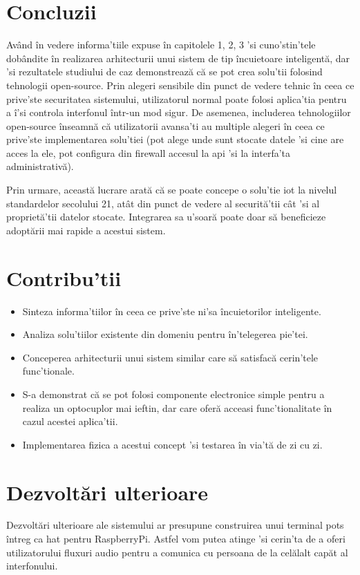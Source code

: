 \section{Concluzii}

Având în vedere informa'tiile expuse în capitolele 1, 2, 3 'si cuno'stin'tele dobândite în realizarea arhitecturii unui sistem de tip încuietoare inteligentă, dar 'si rezultatele studiului de caz demonstrează că se pot crea solu'tii folosind tehnologii open-source. Prin alegeri sensibile din punct de vedere tehnic în ceea ce prive'ste securitatea sistemului, utilizatorul normal poate folosi aplica'tia pentru a î'si controla interfonul într-un mod sigur. De asemenea, includerea tehnologiilor open-source înseamnă că utilizatorii avansa'ti au multiple alegeri în ceea ce prive'ste implementarea solu'tiei (pot alege unde sunt stocate datele 'si cine are acces la ele, pot configura din firewall accesul la \acrshort{api} 'si la interfa'ta administrativă).

Prin urmare, această lucrare arată că se poate concepe o solu'tie \acrshort{iot} la nivelul standardelor secolului 21, atât din punct de vedere al securită'tii cât 'si al proprietă'tii datelor stocate. Integrarea sa u'soară poate doar să beneficieze adoptării mai rapide a acestui sistem.

\section{Contribu'tii}

\begin{itemize}
  \item Sinteza informa'tiilor în ceea ce prive'ste ni'sa încuietorilor inteligente.
  \item Analiza solu'tiilor existente din domeniu pentru în'telegerea pie'tei.
  \item Conceperea arhitecturii unui sistem similar care să satisfacă cerin'tele func'tionale.
  \item S-a demonstrat că se pot folosi componente electronice simple pentru a realiza un optocuplor mai ieftin, dar care oferă acceasi func'tionalitate în cazul acestei aplica'tii.
  \item Implementarea fizica a acestui concept 'si testarea în via'tă de zi cu zi.
\end{itemize}

\section{Dezvoltări ulterioare}

Dezvoltări ulterioare ale sistemului ar presupune construirea unui terminal \acrshort{pots} întreg ca \acrshort{hat} pentru RaspberryPi. Astfel vom putea atinge 'si cerin'ta de a oferi utilizatorului fluxuri audio pentru a comunica cu persoana de la celălalt capăt al interfonului. 